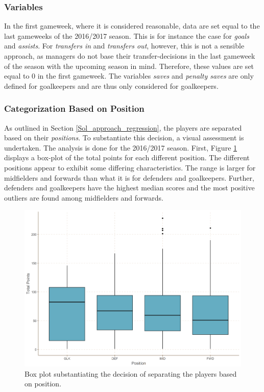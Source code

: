 \subsubsection{Variables}

In the first gameweek, where it is considered reasonable, data are set equal to the last gameweeks of the 2016/2017 season. This is for instance the case for \textit{goals} and \textit{assists}. For \textit{transfers in} and \textit{transfers out}, however, this is not a sensible approach, as managers do not base their transfer-decisions in the last gameweek of the season with the upcoming season in mind. Therefore, these values are set equal to 0 in the first gameweek. The variables \textit{saves} and \textit{penalty saves} are only defined for goalkeepers and are thus only considered for goalkeepers.

\subsubsection{Categorization Based on Position} 

As outlined in Section \ref{Sol_approach_regression}, the players are separated based on their \textit{positions}. To substantiate this decision, a visual assessment is undertaken. The analysis is done for the 2016/2017 season. First, Figure \ref{fig:box_plots} displays a box-plot of the total points for each different position. The different positions appear to exhibit some differing characteristics. The range is larger for midfielders and forwards than what it is for defenders and goalkeepers. Further, defenders and goalkeepers have the highest median scores and the most positive outliers are found among midfielders and forwards. 

\begin{figure}[ht]
    \centering
    \includegraphics[scale=0.3]{fig/chapter_6/box_plots.png}
    \caption{Box plot substantiating the decision of separating the players based on position.}
\label{fig:box_plots}    
\end{figure}


